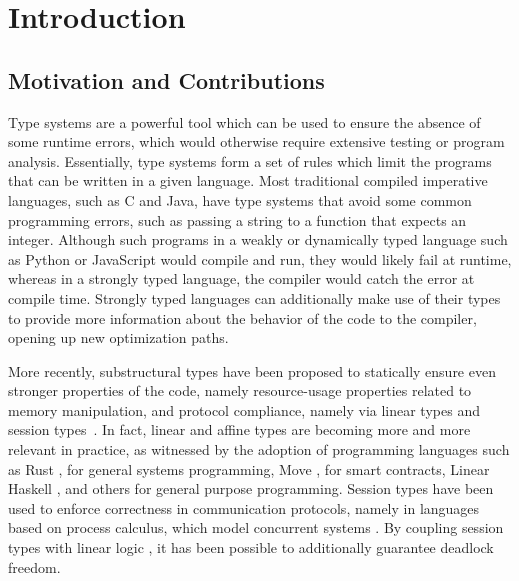 \documentclass[sigconf,nonacm,natbib=true]{acmart}
\begin{document}

\maketitle

\section{Introduction}

\subsection{Motivation and Contributions}

Type systems are a powerful tool which can be used to ensure the absence of some runtime errors, which would otherwise require extensive testing or program analysis. Essentially, type systems form a set of rules which limit the programs that can be written in a given language. Most traditional compiled imperative languages, such as C and Java, have type systems that avoid some common programming errors, such as passing a string to a function that expects an integer. Although such programs in a weakly or dynamically typed language such as Python or JavaScript would compile and run, they would likely fail at runtime, whereas in a strongly typed language, the compiler would catch the error at compile time. Strongly typed languages can additionally make use of their types to provide more information about the behavior of the code to the compiler, opening up new optimization paths.

More recently, substructural types have been proposed to statically ensure even stronger properties of the code, namely resource-usage properties related to memory manipulation, and protocol compliance, namely via linear types and session types~\citep{Wadler:1990,Honda:1998,Mostrous:2014}. In fact, linear and affine types are becoming more and more relevant in practice, as witnessed by the adoption of programming languages such as Rust \citep{Matsakis:2014}, for general systems programming, Move \citep{Move:2019, Move:2020}, for smart contracts, Linear Haskell \citep{Bernardy:2017}, and others \citep{Rast:2022, Ferrite:2022, C0:2016, FreeST:2019, Jacobs:2023} for general purpose programming. Session types have been used to enforce correctness in communication protocols, namely in languages based on process calculus, which model concurrent systems \citep{Milner:1980,Milner:1992:1,Milner:1992:2}. By coupling session types with linear logic \citep{Girard:1987,Caires:2010}, it has been possible to additionally guarantee deadlock freedom. 
\end{document}

